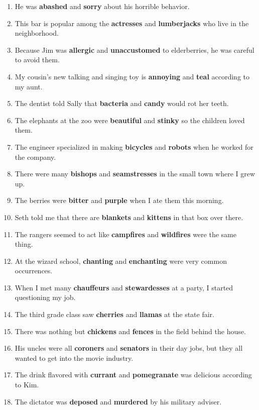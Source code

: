 \documentclass[authoryear]{elsarticle}
\begin{document}
\begin{enumerate}
\item He was \textbf{abashed} and \textbf{sorry} about his horrible behavior.
\item This bar is popular among the \textbf{actresses} and \textbf{lumberjacks} who live in the neighborhood.
\item Because Jim was \textbf{allergic} and \textbf{unaccustomed} to elderberries, he was careful to avoid them.
\item My cousin's new talking and singing toy is \textbf{annoying} and \textbf{teal} according to my aunt.
\item The dentist told Sally that \textbf{bacteria} and \textbf{candy} would rot her teeth.
\item The elephants at the zoo were \textbf{beautiful} and \textbf{stinky} so the children loved them.
\item The engineer specialized in making \textbf{bicycles} and \textbf{robots} when he worked for the company.
\item There were many \textbf{bishops} and \textbf{seamstresses} in the small town where I grew up.
\item The berries were \textbf{bitter} and \textbf{purple} when I ate them this morning.
\item Seth told me that there are \textbf{blankets} and \textbf{kittens} in that box over there.
\item The rangers seemed to act like \textbf{campfires} and \textbf{wildfires} were the same thing.
\item At the wizard school, \textbf{chanting} and \textbf{enchanting} were very common occurrences.
\item When I met many \textbf{chauffeurs} and \textbf{stewardesses} at a party, I started questioning my job.
\item The third grade class saw \textbf{cherries} and \textbf{llamas} at the state fair.
\item There was nothing but \textbf{chickens} and \textbf{fences} in the field behind the house.
\item His uncles were all \textbf{coroners} and \textbf{senators} in their day jobs, but they all wanted to get into the movie industry.
\item The drink flavored with \textbf{currant} and \textbf{pomegranate} was delicious according to Kim.
\item The dictator was \textbf{deposed} and \textbf{murdered} by his military adviser.

\end{enumerate}
\end{document}
